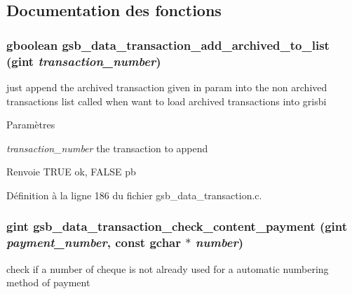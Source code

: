 \subsection{Documentation des fonctions}
\subsubsection[{gsb\_\-data\_\-transaction\_\-add\_\-archived\_\-to\_\-list}]{\setlength{\rightskip}{0pt plus 5cm}gboolean gsb\_\-data\_\-transaction\_\-add\_\-archived\_\-to\_\-list (gint {\em transaction\_\-number})}\label{gsb__data__transaction_8c_a0847630734b4419bc233f313ad6d2766}
just append the archived transaction given in param into the non archived transactions list called when want to load archived transactions into grisbi


\begin{DoxyParams}{Paramètres}
\item[{\em transaction\_\-number}]the transaction to append\end{DoxyParams}
\begin{DoxyReturn}{Renvoie}
TRUE ok, FALSE pb 
\end{DoxyReturn}


Définition à la ligne 186 du fichier gsb\_\-data\_\-transaction.c.

\subsubsection[{gsb\_\-data\_\-transaction\_\-check\_\-content\_\-payment}]{\setlength{\rightskip}{0pt plus 5cm}gint gsb\_\-data\_\-transaction\_\-check\_\-content\_\-payment (gint {\em payment\_\-number}, \/  const gchar $\ast$ {\em number})}\label{gsb__data__transaction_8c_a40575cdeac27ba06abb312fabd076564}
check if a number of cheque is not already used for a automatic numbering method of payment



